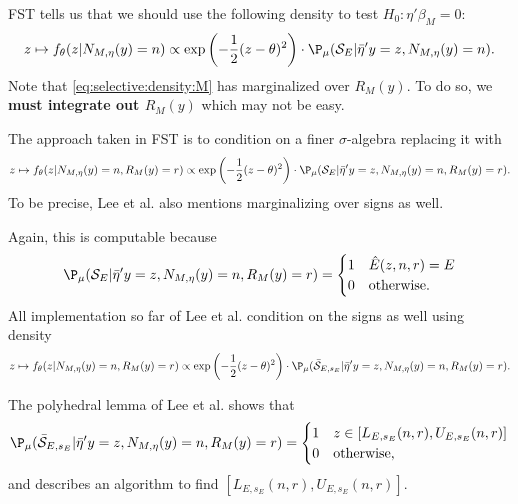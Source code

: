\documentclass{article}
\begin{document}
          FST tells us that we should use the following density to test
          $H_0:\eta'\beta_M=0$:
        \begin{equation}
          \label{eq:selective:density:M}
        z \mapsto f_{\theta}(z | N_{M,\eta}(y)=n) \propto \exp
        \left(-\frac{1}{2}(z-\theta)^2 \right) \cdot \P_{\mu}({\cal
          S}_E | \bar{\eta}'y=z, N_{M,\eta}(y)=n).
        \end{equation}
        Note that \eqref{eq:selective:density:M}  has marginalized
        over $R_M(y)$. To do so, we {\bf must integrate out $R_M(y)$}
        which may not be easy.

        The approach taken in FST is to condition on a finer
        $\sigma$-algebra replacing it with
        \begin{equation}
          \label{eq:selective:density:FST}
        z \mapsto f_{\theta}(z | N_{M,\eta}(y)=n, R_M(y)=r) \propto
        \exp \left(-\frac{1}{2}(z-\theta)^2 \right) \cdot
        \P_{\mu}({\cal S}_E | \bar{\eta}'y=z, N_{M,\eta}(y)=n,
        R_M(y)=r).
        \end{equation}
        To be precise, Lee et al. also mentions marginalizing over
        signs as well.
        
        Again, this is computable because
        $$ \P_{\mu}({\cal S}_E | \bar{\eta}'y=z, N_{M,\eta}(y)=n,
        R_M(y)=r) =
        \begin{cases}
          1 & \hat{E}(z,n,r)=E \\ 0 & \text{otherwise.}
          \end{cases}
        $$
        All implementation so far of Lee et al. condition on the signs as well using density
        \begin{equation}
          \label{eq:selective:density:FST}
        z \mapsto f_{\theta}(z | N_{M,\eta}(y)=n, R_M(y)=r) \propto
        \exp \left(-\frac{1}{2}(z-\theta)^2 \right) \cdot
        \P_{\mu}(\bar{\cal S}_{E,s_E} | \bar{\eta}'y=z,
        N_{M,\eta}(y)=n, R_M(y)=r).
        \end{equation}

        The polyhedral lemma of Lee et al. shows that
        $$ \P_{\mu}(\bar{\cal S}_{E,s_E} | \bar{\eta}'y=z,
        N_{M,\eta}(y)=n, R_M(y)=r) =
        \begin{cases}
          1 & z \in [L_{E,s_E}(n,r), U_{E,s_E}(n,r)] \\ 0 &
          \text{otherwise,}
          \end{cases}
        $$ and describes an algorithm to find $[L_{E,s_E}(n,r),
          U_{E,s_E}(n,r)] $.
\end{document}
